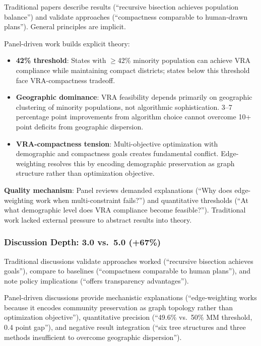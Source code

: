 Traditional papers describe results (``recursive bisection achieves population balance'') and validate approaches (``compactness comparable to human-drawn plans''). General principles are implicit.

Panel-driven work builds explicit theory:

\begin{itemize}[leftmargin=*]
\item \textbf{42\% threshold}: States with $\geq$42\% minority population can achieve VRA compliance while maintaining compact districts; states below this threshold face VRA-compactness tradeoff.

\item \textbf{Geographic dominance}: VRA feasibility depends primarily on geographic clustering of minority populations, not algorithmic sophistication. 3--7 percentage point improvements from algorithm choice cannot overcome 10+ point deficits from geographic dispersion.

\item \textbf{VRA-compactness tension}: Multi-objective optimization with demographic and compactness goals creates fundamental conflict. Edge-weighting resolves this by encoding demographic preservation as graph structure rather than optimization objective.
\end{itemize}

\textbf{Quality mechanism}: Panel reviews demanded explanations (``Why does edge-weighting work when multi-constraint fails?'') and quantitative thresholds (``At what demographic level does VRA compliance become feasible?''). Traditional work lacked external pressure to abstract results into theory.

\subsubsection{Discussion Depth: 3.0 vs.\ 5.0 (+67\%)}

Traditional discussions validate approaches worked (``recursive bisection achieves goals''), compare to baselines (``compactness comparable to human plans''), and note policy implications (``offers transparency advantages'').

Panel-driven discussions provide mechanistic explanations (``edge-weighting works because it encodes community preservation as graph topology rather than optimization objective''), quantitative precision (``49.6\% vs.\ 50\% MM threshold, 0.4 point gap''), and negative result integration (``six tree structures and three methods insufficient to overcome geographic dispersion'').

